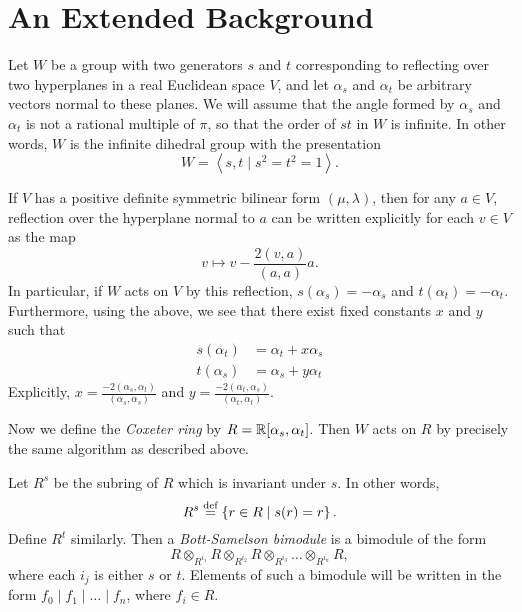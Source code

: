 %

\appendix


\section{An Extended Background}
\label{sec:prelim_background}
Let $W$ be a group with two generators $s$ and $t$ corresponding to reflecting over two hyperplanes in a real Euclidean space $V$, and let $\alpha_s$ and $\alpha_t$ be arbitrary vectors normal to these planes.  We will assume that the angle formed by $\alpha_s$ and $\alpha_t$ is not a rational multiple of $\pi$, so that the order of $st$ in $W$ is infinite.  In other words, $W$ is the infinite dihedral group with the presentation \[ W = \left<s,t \mid s^2=t^2=1\right>. \] 

If $V$ has a positive definite symmetric bilinear form $(\mu, \lambda)$, then for any $a \in V$, reflection over the hyperplane normal to $a$ can be written explicitly for each $v \in V$ as the map \[ v \mapsto v - \frac{2(v,a)}{(a,a)} a. \]  
In particular, if $W$ acts on $V$ by this reflection, $s(\alpha_s) = -\alpha_s$ and $t(\alpha_t) = -\alpha_t$.  Furthermore, using the above, we see that there exist fixed constants $x$ and $y$ such that
\begin{align*}
	s(\alpha_t) &= \alpha_t + x \alpha_s \\
	t(\alpha_s) &= \alpha_s + y \alpha_t
\end{align*}
Explicitly, $x = \frac{-2(\alpha_s,\alpha_t)}{(\alpha_s, \alpha_s)}$ and $y = \frac{-2(\alpha_t,\alpha_s)}{(\alpha_t,\alpha_t)}$.  

Now we define the \emph{Coxeter ring} by $R = \mathbb R[\alpha_s, \alpha_t]$.  Then $W$ acts on $R$ by precisely the same algorithm as described above.

Let $R^s$ be the subring of $R$ which is invariant under $s$.  In other words,
\[ R^s \stackrel{\text{def}}{=} \left\{ r \in R \mid s(r) = r \right\}. \]
Define $R^t$ similarly.  Then a \emph{Bott-Samelson bimodule} is a bimodule of the form
\[ R \otimes_{R^{i_1}} R \otimes_{R^{i_2}} R \otimes_{R^{i_3}} \dots \otimes_{R^{i_n}} R, \]
where each $i_j$ is either $s$ or $t$.   Elements of such a bimodule will be written in the form $f_0 \mid f_1 \mid \dots \mid f_n$, where $f_i \in R$.

